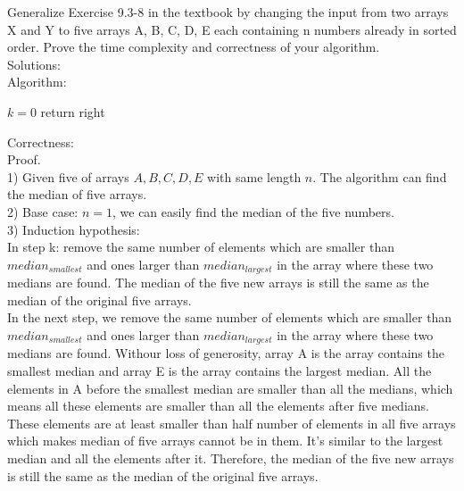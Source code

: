 \documentclass[12pt,letterpaper]{article}
\begin{document}
\begin{enumerate}
Generalize Exercise 9.3-8 in the textbook by changing the input from two arrays X and Y to five arrays A, B, C, D, E each containing n numbers already in sorted order. Prove the time complexity and correctness of your algorithm. \\
Solutions: \\
Algorithm: \\
\begin{algorithm}[H]
 $ k = 0$ \;
 return right\;
\end{algorithm}
Correctness: \\
Proof. \\
1) Given five of arrays $ A,B,C,D,E $ with same length $ n $. The algorithm can find the median of five arrays. \\
2) Base case: $ n = 1$, we can easily find the median of the five numbers. \\
3) Induction hypothesis: \\
In step k: remove the same number of elements which are smaller than $median_{smallest}$ and ones larger than $median_{largest}$ in the array where these two medians are found. The median of the five new arrays is still the same as the median of the original five arrays. \\
In the next step, we remove the same number of elements which are smaller than $median_{smallest}$ and ones larger than $median_{largest}$ in the array where these two medians are found. Withour loss of generosity, array A is the array contains the smallest median and array E is the array contains the largest median. All the elements in A before the smallest median are smaller than all the medians, which means all these elements are smaller than all the elements after five medians. These elements are at least smaller than half number of elements in all five arrays which makes median of five arrays cannot be in them. It's similar to the largest median and all the elements after it. Therefore, the median of the five new arrays is still the same as the median of the original five arrays. \\

\end{enumerate}
\end{document}
